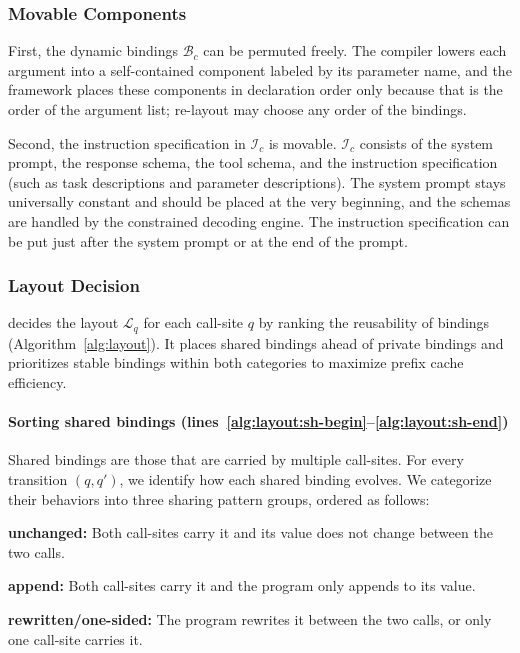 \subsubsection{Movable Components}
First, the dynamic bindings $\mathcal{B}_c$ can be permuted freely. The compiler lowers each argument into a self-contained component labeled by its parameter name, and the framework places these components in declaration order only because that is the order of the argument list; re-layout may choose any order of the bindings.

Second, the instruction specification in $\mathcal{I}_c$ is movable. $\mathcal{I}_c$ consists of the system prompt, the response schema, the tool schema, and the instruction specification (such as task descriptions and parameter descriptions). The system prompt stays universally constant and should be placed at the very beginning, and the schemas are handled by the constrained decoding engine. The instruction specification can be put just after the system prompt or at the end of the prompt.

\subsubsection{Layout Decision}
\label{sec:layout_decision}

\sysname decides the layout $\mathcal{L}_q$ for each call-site $q$ by ranking the reusability of bindings (Algorithm~\ref{alg:layout}). It places shared bindings ahead of private bindings and prioritizes stable bindings within both categories to maximize prefix cache efficiency. 

\paragraph{Sorting shared bindings {\normalfont(lines~\ref{alg:layout:sh-begin}--\ref{alg:layout:sh-end})}} Shared bindings are those that are carried by multiple call-sites. For every transition $(q,q')$, we identify how each shared binding evolves. We categorize their behaviors into three sharing pattern groups, ordered as follows:
\begin{enumerate*}[label=(\textbf{\roman*})]
    \item \textbf{unchanged:} Both call-sites carry it and its value does not change between the two calls.
    \item \textbf{append:} Both call-sites carry it and the program only appends to its value.
    \item \textbf{rewritten/one-sided:} The program rewrites it between the two calls, or only one call-site carries it.
\end{enumerate*}


